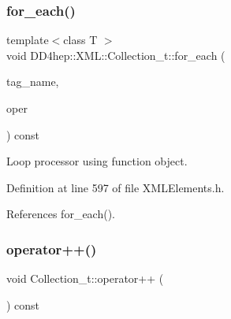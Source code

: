 \hypertarget{class_d_d4hep_1_1_x_m_l_1_1_collection__t_a6b4e31f738c848ce7b277f1a9fa5a637}{}\label{class_d_d4hep_1_1_x_m_l_1_1_collection__t_a6b4e31f738c848ce7b277f1a9fa5a637} 
\subsubsection{\texorpdfstring{for\+\_\+each()}{for\_each()}\hspace{0.1cm}{\footnotesize\ttfamily [2/2]}}
{\footnotesize\ttfamily template$<$class T $>$ \\
void D\+D4hep\+::\+X\+M\+L\+::\+Collection\+\_\+t\+::for\+\_\+each (\begin{DoxyParamCaption}\item[{const \hyperlink{namespace_d_d4hep_1_1_x_m_l_a09e5d9cc86ed782f6826dfe0778c1815}{Xml\+Char} $\ast$}]{tag\+\_\+name,  }\item[{\hyperlink{class_t}{T}}]{oper }\end{DoxyParamCaption}) const\hspace{0.3cm}{\ttfamily [inline]}}



Loop processor using function object. 



Definition at line 597 of file X\+M\+L\+Elements.\+h.



References for\+\_\+each().

\hypertarget{class_d_d4hep_1_1_x_m_l_1_1_collection__t_a4a00ad30df1a6748eaddd31049ca105d}{}\label{class_d_d4hep_1_1_x_m_l_1_1_collection__t_a4a00ad30df1a6748eaddd31049ca105d} 
\subsubsection{\texorpdfstring{operator++()}{operator++()}\hspace{0.1cm}{\footnotesize\ttfamily [1/2]}}
{\footnotesize\ttfamily void Collection\+\_\+t\+::operator++ (\begin{DoxyParamCaption}{ }\end{DoxyParamCaption}) const}



